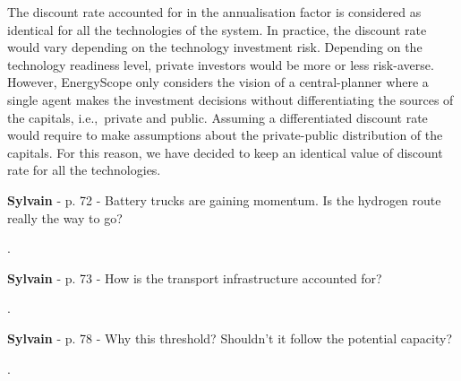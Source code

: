 \documentclass[12pt,a4paper]{article}
\def\ie{i.e.,\ }
\begin{document}
\begin{mdframed}[style=manuscript] %
The discount rate accounted for in the annualisation factor is considered as identical for all the technologies of the system. In practice, the discount rate would vary depending on the technology investment risk. Depending on the technology readiness level, private investors would be more or less risk-averse. However, EnergyScope only considers the vision of a central-planner where a single agent makes the investment decisions without differentiating the sources of the capitals, \ie private and public. Assuming a differentiated discount rate would require to make assumptions about the private-public distribution of the capitals. For this reason, we have decided to keep an identical value of discount rate for all the technologies.
\end{mdframed}

\begin{mdframed}[style=comment] %
{\color{purple} \textbf{Sylvain}} - p. 72 - Battery trucks are gaining momentum. Is the hydrogen route really the way to go?
\end{mdframed}

\noindent {\color{blue} }. 

\begin{mdframed}[style=manuscript] %

\end{mdframed}

\begin{mdframed}[style=comment] %
{\color{purple} \textbf{Sylvain}} - p. 73 - How is the transport infrastructure accounted for?
\end{mdframed}

\noindent {\color{blue} }. 

\begin{mdframed}[style=manuscript] %

\end{mdframed}

\begin{mdframed}[style=comment] %
{\color{purple} \textbf{Sylvain}} - p. 78 - Why this threshold? Shouldn't it follow the potential capacity?
\end{mdframed}

\noindent {\color{blue} }. 

\begin{mdframed}[style=manuscript] %

\end{mdframed}
\end{document}
